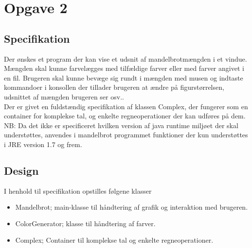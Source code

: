 \section{Opgave 2}

\subsection{Specifikation}
Der ønskes et program der kan vise et udsnit af mandelbrotmængden i et vindue. Mængden skal kunne farvelægges med 
tilfældige farver eller med farver angivet i en fil. Brugeren skal kunne bevæge sig rundt i mængden med musen og 
indtaste kommandoer i konsollen der tillader brugeren at ændre på figurstørrelsen, udsnittet af mængden brugeren 
ser osv.. \\

Der er givet en fuldstændig specifikation af klassen Complex, der fungerer som en container for komplekse tal, 
og enkelte regneoperationer der kan udføres på dem. \\

NB: Da det ikke er specificeret hvilken version af java runtime miljøet der skal understøttes, anvendes i mandelbrot programmet funktioner der kun understøttes i JRE version 1.7 og frem.
\subsection{Design}
I henhold til specifikation opstilles følgene klasser
\begin{itemize}
    \item Mandelbrot; main-klasse til håndtering af grafik og interaktion med brugeren.
    \item ColorGenerator; klasse til håndtering af farver.
    \item Complex; Container til komplekse tal og enkelte regneoperationer.
\end{itemize}


